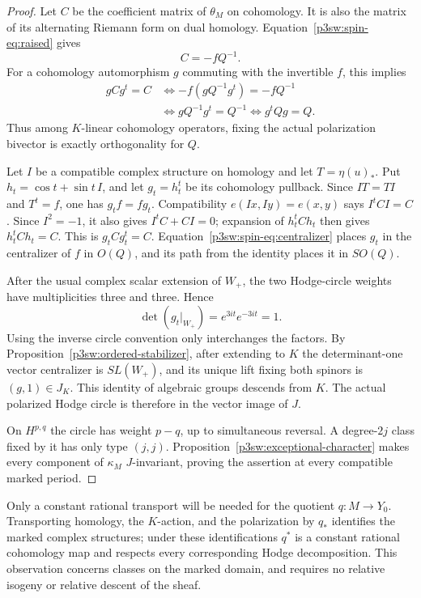 \documentclass[11pt]{article}
\numberwithin{equation}{section}
\begin{document}
\begin{proof}
Let \(C\) be the coefficient matrix of \(\theta_M\) on cohomology.
It is also the matrix of its alternating Riemann form on dual
homology.  Equation~\eqref{p3sw:spin-eq:raised} gives
\[
 C=-fQ^{-1}.
\]
For a cohomology automorphism \(g\) commuting with the invertible
\(f\), this implies
\begin{equation}
\label{p3sw:spin-eq:centralizer}
 \begin{split}
 gCg^t=C
 &\Longleftrightarrow -f(gQ^{-1}g^t)=-fQ^{-1}\\
 &\Longleftrightarrow gQ^{-1}g^t=Q^{-1}
 \Longleftrightarrow g^tQg=Q.
 \end{split}
\end{equation}
Thus among \(K\)-linear cohomology operators, fixing the actual
polarization bivector is exactly orthogonality for \(Q\).

Let \(I\) be a compatible complex structure on homology and let
\(T=\eta(u)_*\).  Put \(h_t=\cos t+\sin t\,I\), and let
\(g_t=h_t^t\) be its cohomology pullback.  Since \(IT=TI\) and
\(T^t=f\), one has \(g_tf=fg_t\).  Compatibility
\(e(Ix,Iy)=e(x,y)\) says \(I^tCI=C\).  Since \(I^2=-1\), it also
gives \(I^tC+CI=0\); expansion of \(h_t^tCh_t\) then gives
\(h_t^tCh_t=C\).  This is \(g_tCg_t^t=C\).
Equation~\eqref{p3sw:spin-eq:centralizer} places \(g_t\) in the
centralizer of \(f\) in \(O(Q)\), and its path from the identity
places it in \(SO(Q)\).

After the usual complex scalar extension of \(W_+\), the two
Hodge-circle weights have multiplicities three and three.  Hence
\[
 \det(g_t|_{W_+})=e^{3it}e^{-3it}=1.
\]
Using the inverse circle convention only interchanges the factors.
By Proposition~\ref{p3sw:ordered-stabilizer}, after extending to
\(K\) the determinant-one vector centralizer is \(SL(W_+)\), and
its unique lift fixing both spinors is \((g,1)\in J_K\).
This identity of algebraic groups descends from \(K\).  The actual
polarized Hodge circle is therefore in the vector image of \(J\).

On \(H^{p,q}\) the circle has weight \(p-q\), up to simultaneous
reversal.  A degree-\(2j\) class fixed by it has only type \((j,j)\).
Proposition~\ref{p3sw:exceptional-character} makes every component
of \(\kappa_M\) \(J\)-invariant, proving the assertion at every
compatible marked period.
\end{proof}

Only a constant rational transport will be needed for the quotient
\(q:M\to Y_0\).  Transporting homology, the \(K\)-action, and the
polarization by \(q_*\) identifies the marked complex structures;
under these identifications \(q^*\) is a constant rational
cohomology map and respects every corresponding Hodge decomposition.
This observation concerns classes on the marked domain, and requires
no relative isogeny or relative descent of the sheaf.
\end{document}
